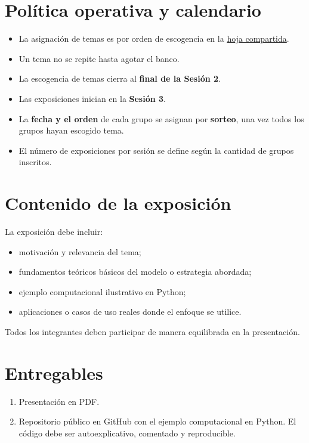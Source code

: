 \documentclass[11pt,letterpaper]{article}
\newcommand{\signup}{https://eafit-my.sharepoint.com/:x:/g/personal/avasquezr3_eafit_edu_co/IQBMNr9rRCRzSIhl0wmT5yroAXJ4WnD7ZvdjMnQujZHcw5Y?e=CsqvSX}
\begin{document}
\section{Política operativa y calendario}
\begin{itemize}
  \item La asignación de temas es por orden de escogencia en la \href{\signup}{hoja compartida}.
  \item Un tema no se repite hasta agotar el banco.
  \item La escogencia de temas cierra al \textbf{final de la Sesión 2}.
  \item Las exposiciones inician en la \textbf{Sesión 3}.
  \item La \textbf{fecha y el orden} de cada grupo se asignan por \textbf{sorteo}, una vez todos los grupos hayan escogido tema.
  \item El número de exposiciones por sesión se define según la cantidad de grupos inscritos.
\end{itemize}

\section{Contenido de la exposición}
La exposición debe incluir:
\begin{itemize}
  \item motivación y relevancia del tema;
  \item fundamentos teóricos básicos del modelo o estrategia abordada;
  \item ejemplo computacional ilustrativo en Python;
  \item aplicaciones o casos de uso reales donde el enfoque se utilice.
\end{itemize}
Todos los integrantes deben participar de manera equilibrada en la presentación.

\section{Entregables}
\begin{enumerate}
  \item Presentación en PDF.
  \item Repositorio público en GitHub con el ejemplo computacional en Python. El código debe ser autoexplicativo, comentado y reproducible.
\end{enumerate}
\end{document}
